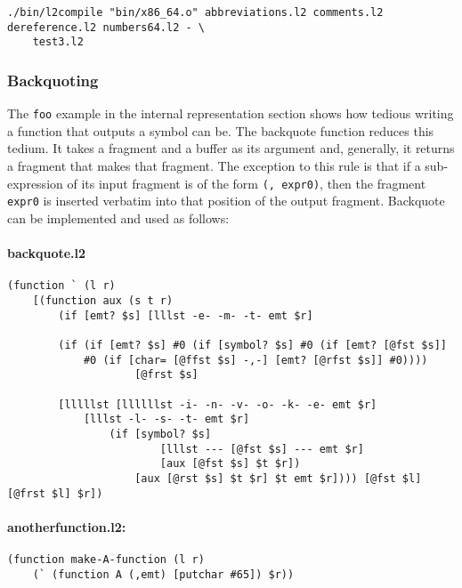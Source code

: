 \documentclass[]{article}
\let\oldparagraph\paragraph
\renewcommand{\paragraph}[1]{\oldparagraph{#1}\mbox{}}
\begin{document}
\begin{verbatim}
./bin/l2compile "bin/x86_64.o" abbreviations.l2 comments.l2 dereference.l2 numbers64.l2 - \
    test3.l2
\end{verbatim}

\hypertarget{backquoting}{%
\subsubsection{Backquoting}\label{backquoting}}

The \texttt{foo} example in the internal representation section shows
how tedious writing a function that outputs a symbol can be. The
backquote function reduces this tedium. It takes a fragment and a buffer
as its argument and, generally, it returns a fragment that makes that
fragment. The exception to this rule is that if a sub-expression of its
input fragment is of the form \texttt{(,\ expr0)}, then the fragment
\texttt{expr0} is inserted verbatim into that position of the output
fragment. Backquote can be implemented and used as follows:

\hypertarget{backquote.l2}{%
\paragraph{backquote.l2}\label{backquote.l2}}

\begin{verbatim}
(function ` (l r)
    [(function aux (s t r)
        (if [emt? $s] [lllst -e- -m- -t- emt $r]

        (if (if [emt? $s] #0 (if [symbol? $s] #0 (if [emt? [@fst $s]]
            #0 (if [char= [@ffst $s] -,-] [emt? [@rfst $s]] #0))))
                    [@frst $s]

        [lllllst [llllllst -i- -n- -v- -o- -k- -e- emt $r]
            [lllst -l- -s- -t- emt $r]
                (if [symbol? $s]
                        [lllst --- [@fst $s] --- emt $r]
                        [aux [@fst $s] $t $r])
                    [aux [@rst $s] $t $r] $t emt $r]))) [@fst $l] [@frst $l] $r])
\end{verbatim}

\hypertarget{anotherfunction.l2:}{%
\paragraph{anotherfunction.l2:}\label{anotherfunction.l2:}}

\begin{verbatim}
(function make-A-function (l r)
    (` (function A (,emt) [putchar #65]) $r))
\end{verbatim}
\end{document}
